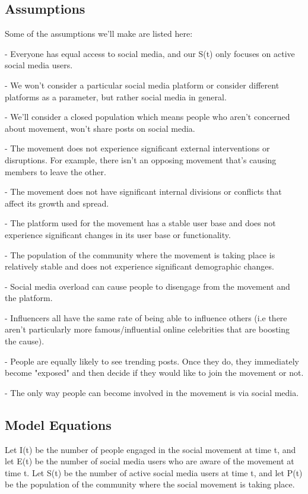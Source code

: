 \documentclass{article}
\begin{document}
    \subsection{Assumptions}
    
    Some of the assumptions we'll make are listed here:

    
    - Everyone has equal access to social media, and our S(t) only focuses on active social media users.
    
    - We won't consider a particular social media platform or consider different platforms as a parameter, but rather social media in general. 
    
    - We'll consider a closed population which means people who aren't concerned about movement, won't share posts on social media. 
    
    - The movement does not experience significant external interventions or disruptions. For example, there isn't an opposing movement that's causing members to leave the other. 
    
    - The movement does not have significant internal divisions or conflicts that affect its growth and spread.
    
    - The platform used for the movement has a stable user base and does not experience significant changes in its user base or functionality.

    - The population of the community where the movement is taking place is relatively stable and does not experience significant demographic changes.

    - Social media overload can cause people to disengage from the movement and the platform.

    - Influencers all have the same rate of being able to influence others (i.e there aren’t particularly more famous/influential online celebrities that are boosting the cause). 

    - People are equally likely to see trending posts. Once they do, they immediately become "exposed" and then decide if they would like to join the movement or not. 

    - The only way people can become involved in the movement is via social media. 

    \subsection{Model Equations}

     Let I(t) be the number of people engaged in the social movement at time t, and let E(t) be the number of social media users who are aware of the movement at time t. Let S(t) be the number of active social media users at time t, and let P(t) be the population of the community where the social movement is taking place. 
\end{document}
